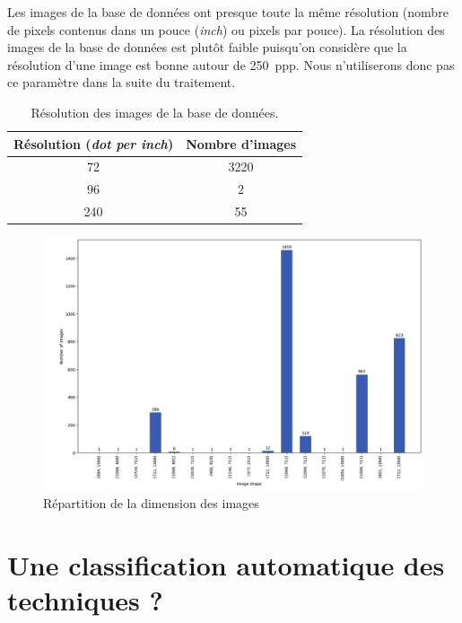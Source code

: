 Les images de la base de données ont presque toute la même résolution (nombre de pixels contenus dans un pouce (\textit{inch}) ou pixels par pouce). La résolution des images de la base de données est plutôt faible puisqu'on considère que la résolution d'une image est bonne autour de 250~ppp. Nous n'utiliserons donc pas ce paramètre dans la suite du traitement.

\begin{table}[!h]
    \centering
    \begin{tabular}{|c|c|}
        \hline
         \cellcolor{blue!20}\textbf{Résolution (\textit{dot per inch})} & \cellcolor{blue!20}\textbf{Nombre d'images} \\ \hline \hline
         72 &  3220 \\ \hline
         96 & 2 \\ \hline
         240 & 55 \\ \hline
    \end{tabular}
    \caption{Résolution des images de la base de données.}
    \label{tab:resolution}
\end{table}

\clearpage

\begin{figure}[!h]
	\begin{center}
		\includegraphics[width=16cm]{../images/dimension.png}
	 \end{center}
	 \caption{Répartition de la dimension des images}
\end{figure}


\section{Une classification automatique des techniques ?}

